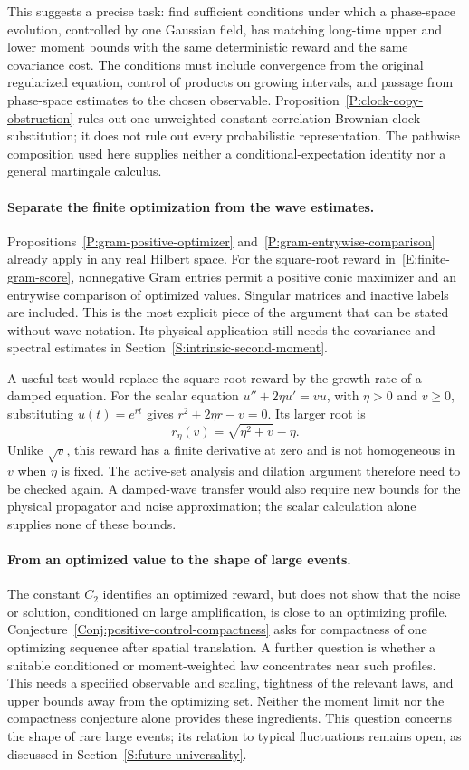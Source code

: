 This suggests a precise task: find sufficient conditions under which a
phase-space evolution, controlled by one Gaussian field, has matching
long-time upper and lower moment bounds with the same deterministic reward
and the same covariance cost. The conditions must include convergence from
the original regularized equation, control of products on growing intervals,
and passage from phase-space estimates to the chosen observable.
Proposition~\ref{P:clock-copy-obstruction} rules out one unweighted
constant-correlation Brownian-clock substitution; it does not rule out every
probabilistic representation. The pathwise composition used here supplies
neither a conditional-expectation identity nor a general martingale calculus.

\paragraph{Separate the finite optimization from the wave estimates.}
Propositions~\ref{P:gram-positive-optimizer}
and~\ref{P:gram-entrywise-comparison} already apply in any real Hilbert space.
For the square-root reward in~\eqref{E:finite-gram-score}, nonnegative Gram
entries permit a positive conic maximizer and an entrywise comparison of
optimized values. Singular matrices and inactive labels are included. This
is the most explicit piece of the argument that can be stated without wave
notation. Its physical application still needs the covariance and spectral
estimates in Section~\ref{S:intrinsic-second-moment}.

A useful test would replace the square-root reward by the growth rate of a
damped equation. For the scalar equation $u''+2\eta u'=vu$, with $\eta>0$
and $v\ge0$, substituting $u(t)=e^{rt}$ gives
$r^2+2\eta r-v=0$. Its larger root is
\[
  r_\eta(v)=\sqrt{\eta^2+v}-\eta.
\]
Unlike $\sqrt v$, this reward has a finite derivative at zero and is not
homogeneous in $v$ when $\eta$ is fixed. The active-set analysis and dilation
argument therefore need to be checked again. A damped-wave transfer would
also require new bounds for the physical propagator and noise approximation;
the scalar calculation alone supplies none of these bounds.

\paragraph{From an optimized value to the shape of large events.}
The constant $C_2$ identifies an optimized reward, but does not show that the
noise or solution, conditioned on large amplification, is close to an
optimizing profile. Conjecture~\ref{Conj:positive-control-compactness} asks
for compactness of one optimizing sequence after spatial translation.
A further question is whether a suitable conditioned or moment-weighted law
concentrates near such profiles. This needs a specified observable and
scaling, tightness of the relevant laws, and upper bounds away from the
optimizing set. Neither the moment limit nor the compactness conjecture alone
provides these ingredients. This question concerns the shape of rare large
events; its relation to typical fluctuations remains open, as discussed in
Section~\ref{S:future-universality}.

